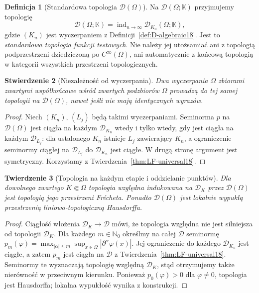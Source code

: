 \documentclass[11pt,a4paper]{article}
\numberwithin{equation}{section}
\theoremstyle{plain}
\newtheorem{twierdzenie}{Twierdzenie}[section]
\newtheorem{stwierdzenie}[twierdzenie]{Stwierdzenie}
\theoremstyle{definition}
\newtheorem{definicja}[twierdzenie]{Definicja}
\theoremstyle{remark}
\newcommand{\N}{\mathbb N}
\newcommand{\K}{\mathbb K}
\begin{document}
\begin{definicja}[Standardowa topologia $\mathcal D(\Omega)$]
\label{def:D-LF18}
Na $\mathcal D(\Omega;\K)$ przyjmujemy topologię
\[
 \mathcal D(\Omega;\K)
   =\operatorname{ind}_{n\to\infty}\mathcal D_{K_n}(\Omega;\K),
\]
gdzie $(K_n)$ jest wyczerpaniem z
Definicji~\ref{def:D-algebraic18}. Jest to \emph{standardowa
topologia funkcji testowych}. Nie należy jej utożsamiać
ani z topologią podprzestrzeni dziedziczoną po
$C^\infty(\Omega)$, ani automatycznie z końcową topologią
w kategorii wszystkich przestrzeni topologicznych.
\end{definicja}

\begin{stwierdzenie}[Niezależność od wyczerpania]
\label{prop:D-independence18}
Dwa wyczerpania $\Omega$ zbiorami zwartymi współkońcowe
wśród zwartych podzbiorów $\Omega$ prowadzą do tej samej
topologii na $\mathcal D(\Omega)$, nawet jeśli nie mają
identycznych wyrazów.
\end{stwierdzenie}
\begin{proof}
Niech $(K_n)$, $(L_j)$ będą takimi wyczerpaniami.
Seminorma $p$ na $\mathcal D(\Omega)$ jest ciągła na
każdym $\mathcal D_{K_n}$ wtedy i tylko wtedy, gdy jest
ciągła na każdym $\mathcal D_{L_j}$: dla ustalonego $K_n$
istnieje $L_j$ zawierający $K_n$, a ograniczenie seminormy
ciągłej na $\mathcal D_{L_j}$ do $\mathcal D_{K_n}$ jest
ciągłe. W drugą stronę argument jest symetryczny.
Korzystamy z Twierdzenia~\ref{thm:LF-universal18}.
\end{proof}

\begin{twierdzenie}[Topologia na każdym etapie i oddzielanie punktów]
\label{thm:D-stage18}
Dla dowolnego zwartego $K\Subset\Omega$ topologia względna
indukowana na $\mathcal D_K$ przez $\mathcal D(\Omega)$
jest topologią jego przestrzeni Fr\'echeta.
Ponadto $\mathcal D(\Omega)$ jest lokalnie wypukłą
przestrzenią liniowo-topologiczną Hausdorffa.
\end{twierdzenie}
\begin{proof}
Ciągłość włożenia $\mathcal D_K\to\mathcal D$ mówi, że
topologia względna nie jest silniejsza od topologii
$\mathcal D_K$. Dla każdego $m\in\N_0$ określmy na
całej $\mathcal D$ seminormę
$p_m(\varphi)=\max_{|\alpha|\le m}\sup_{x\in\Omega}
|\partial^\alpha\varphi(x)|$. Jej ograniczenie do
każdego $\mathcal D_{K_n}$ jest ciągłe, a zatem $p_m$
jest ciągła na $\mathcal D$ z
Twierdzenia~\ref{thm:LF-universal18}. Seminormy te
wyznaczają topologię względną $\mathcal D_K$, stąd
otrzymujemy także nierówność w przeciwnym kierunku.
Ponieważ $p_0(\varphi)>0$ dla $\varphi\ne0$, topologia
jest Hausdorffa; lokalna wypukłość wynika z konstrukcji.
\end{proof}
\end{document}
